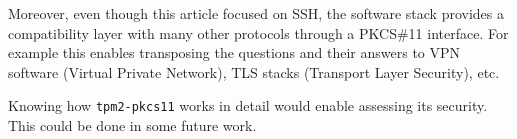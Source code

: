 Moreover, even though this article focused on SSH, the software stack
provides a compatibility layer with many other protocols through a
PKCS\#11 interface. For example this enables transposing the questions
and their answers to VPN software (Virtual Private Network), TLS stacks
(Transport Layer Security), etc.

Knowing how \texttt{tpm2-pkcs11} works in detail would
enable assessing its security. This could be done in some future work.


